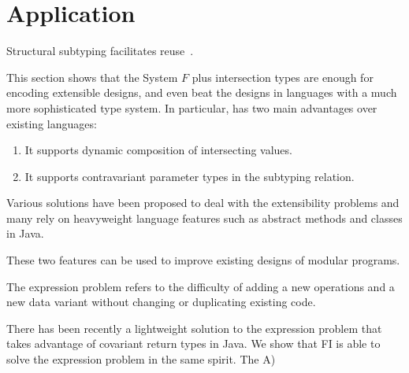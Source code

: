 \section{Application} \label{sec:application}

Structural subtyping facilitates reuse~\cite{malayeri2008integrating}.

This section shows that the System $ F $ plus intersection types are enough for
encoding extensible designs, and even beat the designs in languages with a much
more sophisticated type system. In particular, \name has two main advantages
over existing languages:

\begin{enumerate}
\item It supports dynamic composition of intersecting values.
\item It supports contravariant parameter types in the subtyping relation.
\end{enumerate}

Various solutions have been proposed to deal with the extensibility problems and
many rely on heavyweight language features such as abstract methods and classes
in Java.


These two features can be used to improve existing designs of modular programs.


The expression problem refers to the difficulty of adding a new operations and a
new data variant without changing or duplicating existing code.

There has been recently a lightweight solution to the expression problem that
takes advantage of covariant return types in Java. We show that FI is able to
solve the expression problem in the same spirit. The
A)







